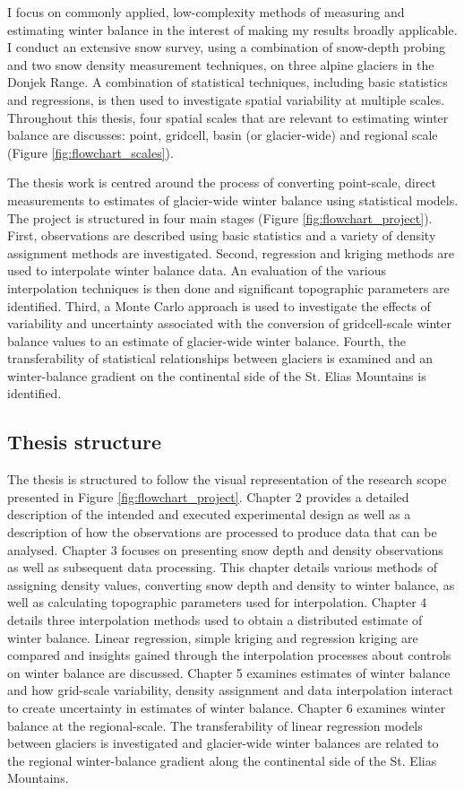 \documentclass{sfuthesis}
\begin{document}
I focus on commonly applied, low-complexity methods of measuring and estimating winter balance in the interest of making my results broadly applicable. I conduct an extensive snow survey, using a combination of snow-depth probing and two snow density measurement techniques, on three alpine glaciers in the Donjek Range. A combination of statistical techniques, including basic statistics and regressions, is then used to investigate spatial variability at multiple scales. Throughout this thesis, four spatial scales that are relevant to estimating winter balance are discusses: point, gridcell, basin (or glacier-wide) and regional scale (Figure \ref{fig:flowchart_scales}). 

The thesis work is centred around the process of converting point-scale, direct measurements to estimates of glacier-wide winter balance using statistical models. The project is structured in four main stages (Figure \ref{fig:flowchart_project}). First, observations are described using basic statistics and a variety of density assignment methods are investigated. Second, regression and kriging methods are used to interpolate winter balance data. An evaluation of the various interpolation techniques is then done and significant topographic parameters are identified. Third, a Monte Carlo approach is used to investigate the effects of variability and uncertainty associated with the conversion of gridcell-scale winter balance values to an estimate of glacier-wide winter balance. Fourth, the transferability of statistical relationships between glaciers is examined and an winter-balance gradient on the continental side of the St. Elias Mountains is identified.

\subsection{Thesis structure}
The thesis is structured to follow the visual representation of the research scope presented in Figure \ref{fig:flowchart_project}. Chapter 2 provides a detailed description of the intended and executed experimental design as well as a description of how the observations are processed to produce data that can be analysed. Chapter 3 focuses on presenting snow depth and density observations as well as subsequent data processing. This chapter details various methods of assigning density values, converting snow depth and density to winter balance, as well as calculating topographic parameters used for interpolation. Chapter 4 details three interpolation methods used to obtain a distributed estimate of winter balance. Linear regression, simple kriging and regression kriging are compared and insights gained through the interpolation processes about controls on winter balance are discussed. Chapter 5 examines estimates of winter balance and how grid-scale variability, density assignment and data interpolation interact to create uncertainty in estimates of winter balance. Chapter 6 examines winter balance at the regional-scale. The transferability of linear regression models between glaciers is investigated and glacier-wide winter balances are related to the regional winter-balance gradient along the continental side of the St. Elias Mountains. 
\end{document}
